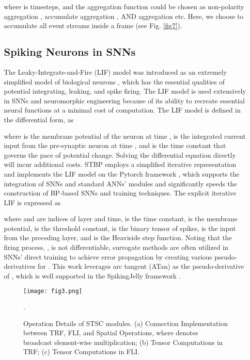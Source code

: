 \documentclass[letterpaper]{article} \usepackage[submission]{aaai23}  \usepackage{times}  \usepackage{helvet}  \usepackage{courier}  \usepackage[hyphens]{url}  \usepackage{graphicx} \urlstyle{rm} \def\UrlFont{\rm}  \usepackage{natbib}  \usepackage{caption} \frenchspacing  \setlength{\pdfpagewidth}{8.5in} \setlength{\pdfpageheight}{11in} \usepackage{algorithm}
\begin{document}
where  is timesteps, and the aggregation function  could be chosen as non-polarity aggregation \cite{massa_efficient_2020}, accumulate aggregation \cite{deng_rethinking_2020}, AND aggregation \cite{he_comparing_2020} etc. Here, we choose to accumulate all event streams inside a frame (see Fig. \ref{fig7}).

\subsection{Spiking Neurons in SNNs}
The Leaky-Integrate-and-Fire (LIF) model was introduced as an extremely simplified model of biological neurons \cite{dayan_theoretical_2005}, which has the essential qualities of potential integrating, leaking, and spike firing. 
The LIF model is used extensively in SNNs and neuromorphic engineering because of its ability to recreate essential neural functions at a minimal cost of computation.
The LIF model is defined in the differential form, as

where  is the membrane potential of the neuron at time ,  is the integrated current input from the pre-synaptic neuron at time , and  is the time constant that governs the pace of potential change.
Solving the differential equation directly will incur additional costs. STBP \cite{wu_spatio-temporal_2018} employs a simplified iterative representation and implements the LIF model on the Pytorch framework \cite{paszke_pytorch_2019}, which supports the integration of SNNs and standard ANNs' modules and significantly speeds the construction of BP-based SNNs and training techniques. The explicit iterative LIF is expressed as


where  and  are indices of layer and time,  is the time constant,  is the membrane potential,  is the threshold constant,  is the binary tensor of spikes,  is the input from the preceding layer, and  is the Heaviside step function.
Noting that the firing process, , is not differentiable, surrogate methods are often utilized in SNNs' direct training to achieve error propagation by creating various pseudo-derivatives for  \cite{neftci_surrogate_2019}. 
This work leverages arc tangent (ATan) as the pseudo-derivative of , which is well supported in the SpikingJelly framework \cite{SpikingJelly}. 

\begin{figure}[t]
\centering
\texttt{[image: fig3.png]} 
\caption{Operation Details of STSC modules. (a) Connection Implementation between TRF, FLI, and Spatial Operations, where  denotes broadcast element-wise multiplication; (b) Tensor Computations in TRF; (c) Tensor Computations in FLI. 
}.
\label{fig3}
\end{figure}
\end{document}
